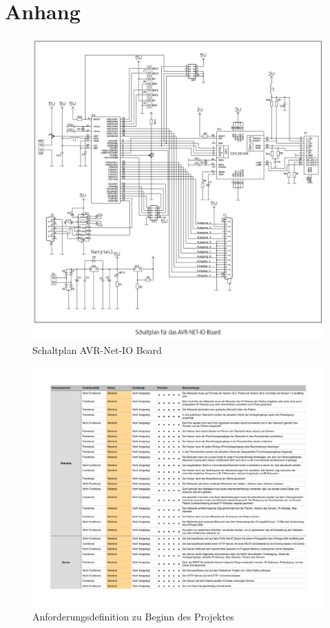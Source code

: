 \chapter{Anhang}

\begin{figure}[H]
  \includegraphics[width=14cm]{content/pictures/AVR-NET-IO_schaltplan.png}
  \caption{Schaltplan AVR-Net-IO Board}
  \label{anh:schaltplan}
\end{figure}

\begin{figure}[H]
  \includegraphics[width=16cm]{content/pictures/Anforderungen.pdf}
  \caption{Anforderungsdefinition zu Beginn des Projektes}
  \label{anh:schaltplan}
\end{figure}